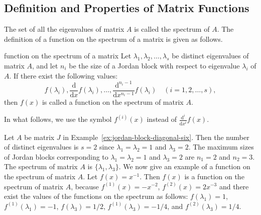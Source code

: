 \subsection{{Definition and Properties of Matrix Functions}}\label{sec:matrix-function-properties}

{The set of all the eigenvalues of matrix $A$ is called the spectrum of $A$. The definition of a function on the spectrum of a matrix is given as follows.}

\begin{Definition}{{function on the spectrum of a matrix}}\label{def:function-on-matrix-spectrum}
{Let $\lambda_1,\lambda_2,\ldots,\lambda_s$ be distinct eigenvalues of matrix $A$, and let $n_i$ be the size of a Jordan block with respect to eigenvalue $\lambda_i$ of $A$. If there exist the following values:}
\[f(\lambda_i),\frac{\mathrm{d}}{\mathrm{d}x}f(\lambda_i),\ldots,\frac{\mathrm{d}^{n_i-1}}{\mathrm{d}x^{n_i-1}}f(\lambda_i)\quad(i=1,2,\ldots,s),\]
{then $f(x)$ is called a function on the spectrum of matrix $A$.}
\end{Definition}

{In what follows, we use the symbol $f^{(i)}(x)$ instead of $\frac{\mathrm{d}^i}{\mathrm{d}x^i}f(x)$.}

\begin{Example}\label{ex:inverse-on-jordan-spectrum}
{Let $A$ be matrix $J$ in Example~\ref{ex:jordan-block-diagonal-six}. Then the number of distinct eigenvalues is $s=2$ since $\lambda_1=\lambda_2=1$ and $\lambda_3=2$. The maximum sizes of Jordan blocks corresponding to $\lambda_1=\lambda_2=1$ and $\lambda_3=2$ are $n_1=2$ and $n_2=3$. The spectrum of matrix $A$ is $\{\lambda_1,\lambda_3\}$. We now give an example of a function on the spectrum of matrix $A$. Let $f(x)=x^{-1}$. Then $f(x)$ is a function on the spectrum of matrix $A$, because $f^{(1)}(x)=-x^{-2}$, $f^{(2)}(x)=2x^{-3}$ and there exist the values of the functions on the spectrum as follows: $f(\lambda_1)=1$, $f^{(1)}(\lambda_1)=-1$, $f(\lambda_3)=1/2$, $f^{(1)}(\lambda_3)=-1/4$, and $f^{(2)}(\lambda_3)=1/4$.}
\end{Example}

